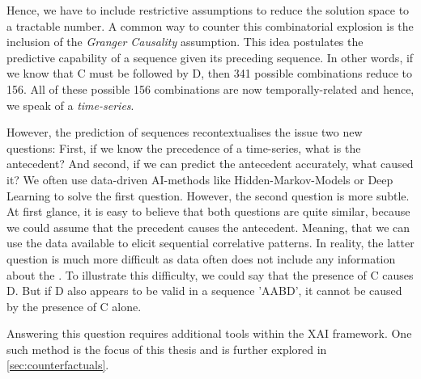 \documentclass[./../../paper.tex]{subfiles}
\begin{document}
Hence, we have to include restrictive assumptions to reduce the solution space to a tractable number. A common way to counter this combinatorial explosion is the inclusion of the \emph{Granger Causality} assumption. 
This idea postulates the predictive capability of a sequence given its preceding sequence. 
In other words, if we know that C must be followed by D, then 341 possible combinations reduce to 156. All of these possible 156 combinations are now temporally-related and hence, we speak of a \emph{time-series}.


However, the prediction of sequences recontextualises the issue two new questions: 
First, if we know the precedence of a time-series, what is the antecedent? 
And second, if we can predict the antecedent accurately, what caused it? 
We often use data-driven AI-methods like Hidden-Markov-Models or Deep Learning to solve the first question. 
However, the second question is more subtle. At first glance, it is easy to believe that both questions are quite similar, because we could assume that the precedent causes the antecedent. Meaning, that we can use the data available to elicit sequential correlative patterns. 
In reality, the latter question is much more difficult as data often does not include any information about the . 
To illustrate this difficulty, we could say that the presence of C causes D. 
But if D also appears to be valid in a sequence 'AABD', it cannot be caused by the presence of C alone. 

Answering this question requires additional tools within the \gls{XAI} framework. 
One such method is the focus of this thesis and is further explored in \autoref{sec:counterfactuals}.
\end{document}
